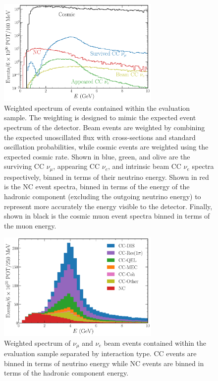 \begin{figure} %
    \includegraphics[width=0.7\textwidth]{diagrams/7-results/explore_osc_fluxes.pdf}
    \caption[Weighted spectrum of evaluation sample events]
    {Weighted spectrum of events contained within the evaluation sample. The weighting is designed
        to mimic the expected event spectrum of the \chipsfive detector. Beam events are weighted
        by combining the expected unoscillated flux with cross-sections and standard oscillation
        probabilities, while cosmic events are weighted using the expected cosmic rate. Shown in
        blue, green, and olive are the surviving CC $\nu_{\mu}$, appearing CC $\nu_{e}$, and
        intrinsic beam CC $\nu_{e}$ spectra respectively, binned in terms of their neutrino
        energy. Shown in red is the NC event spectra, binned in terms of the energy of the
        hadronic component (excluding the outgoing neutrino energy) to represent more accurately
        the energy visible to the detector. Finally, shown in black is the cosmic muon event
        spectra binned in terms of the muon energy.}
    \label{fig:explore_osc_fluxes}
\end{figure}

\begin{figure} %
    \includegraphics[width=0.7\textwidth]{diagrams/7-results/explore_stacked_int_types.pdf}
    \caption[Weighted spectrum of interaction types within the evaluation sample]
    {Weighted spectrum of $\nu_{\mu}$ and $\nu_{e}$ beam events contained within the evaluation
        sample separated by interaction type. CC events are binned in terms of neutrino energy
        while NC events are binned in terms of the hadronic component energy.}
    \label{fig:explore_stacked_int_types}
\end{figure}

